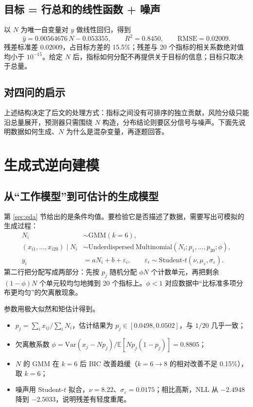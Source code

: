 \documentclass[12pt,a4paper]{ctexart}
\begin{document}
\subsection{目标 = 行总和的线性函数 + 噪声}
以 $N$ 为唯一自变量对 $y$ 做线性回归，得到
\[
\hat y=0.00564676\,N-0.053355,\qquad R^2=0.8450,\qquad \text{RMSE}=0.02009.
\]
残差标准差 0.02009，占目标方差的 15.5\%；残差与 20 个指标的相关系数绝对值均小于 $10^{-15}$。给定 $N$ 后，指标如何分配不再提供关于目标的信息；目标只取决于总量。



\subsection{对四问的启示}
上述结构决定了后文的处理方式：指标之间没有可排序的独立贡献，风险分级只能沿总量展开，预测器只需围绕 \(N\) 构造，分布结论则要区分信号与噪声。下面先说明数据如何生成、\(N\) 为什么是混杂变量，再逐题回答。

\section{生成式逆向建模}

\subsection{从“工作模型”到可估计的生成模型}
第 \ref{sec:eda} 节给出的是条件均值。要检验它是否描述了数据，需要写出可模拟的生成过程：
\[
\begin{aligned}
N_i &\sim \mathrm{GMM}(k=6),\\
(x_{i1},\dots,x_{i20})\mid N_i &\sim \mathrm{Underdispersed\ Multinomial}(N_i;p_1,\dots,p_{20};\phi),\\
y_i &= aN_i+b+\varepsilon_i,\qquad \varepsilon_i\sim \mathrm{Student\text{-}}t(\nu,\mu_\varepsilon,\sigma_\varepsilon).
\end{aligned}
\]
第二行把分配写成两部分：先按 \(p_j\) 随机分配 \(\phi N\) 个计数单元，再把剩余 \((1-\phi)N\) 个单元较均匀地摊到 20 个指标上。\(\phi<1\) 对应数据中“比标准多项分布更均匀”的欠离散现象。

参数用极大似然和矩估计得到。
\begin{itemize}
  \item \(p_j=\sum_i x_{ij}/\sum_i N_i\)，估计结果为 \(p_j\in[0.0498,0.0502]\)，与 \(1/20\) 几乎一致；
  \item 欠离散系数 \(\phi=\mathrm{Var}(x_j-Np_j)/\mathbb{E}[Np_j(1-p_j)]=0.8805\)；
  \item \(N\) 的 GMM 在 \(k=6\) 后 BIC 改善趋缓（\(k=6\to8\) 的相对改善不足 0.15\%），取 \(k=6\)；
  \item 噪声用 Student-\(t\) 拟合，\(\nu=8.22\)、\(\sigma_\varepsilon=0.0175\)；相比高斯，NLL 从 \(-2.4948\) 降到 \(-2.5033\)，说明残差有轻度重尾。
\end{itemize}
\end{document}
